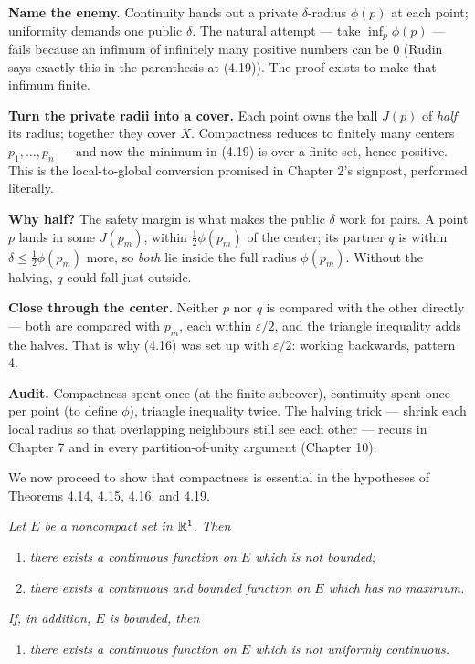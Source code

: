 \begin{proofwalk}
  \item \textbf{Name the enemy.} Continuity hands out a private
        $\delta$-radius $\phi(p)$ at each point; uniformity demands one
        public $\delta$. The natural attempt --- take
        $\inf_p \phi(p)$ --- fails because an infimum of infinitely many
        positive numbers can be $0$ (Rudin says exactly this in the
        parenthesis at (4.19)). The proof exists to make that infimum
        finite.
  \item \textbf{Turn the private radii into a cover.} Each point owns the
        ball $J(p)$ of \emph{half} its radius; together they cover $X$.
        Compactness reduces to finitely many centers $p_1,\dots,p_n$ --- and
        now the minimum in (4.19) is over a finite set, hence positive. This
        is the local-to-global conversion promised in Chapter 2's signpost,
        performed literally.
  \item \textbf{Why half?} The safety margin is what makes the public
        $\delta$ work for pairs. A point $p$ lands in some $J(p_m)$, within
        $\tfrac12\phi(p_m)$ of the center; its partner $q$ is within
        $\delta \le \tfrac12\phi(p_m)$ more, so \emph{both} lie inside the
        full radius $\phi(p_m)$. Without the halving, $q$ could fall just
        outside.
  \item \textbf{Close through the center.} Neither $p$ nor $q$ is compared
        with the other directly --- both are compared with $p_m$, each
        within $\varepsilon/2$, and the triangle inequality adds the halves.
        That is why (4.16) was set up with $\varepsilon/2$: working
        backwards, pattern 4.
  \item \textbf{Audit.} Compactness spent once (at the finite subcover),
        continuity spent once per point (to define $\phi$), triangle
        inequality twice. The halving trick --- shrink each local radius so
        that overlapping neighbours still see each other --- recurs in
        Chapter 7 and in every partition-of-unity argument (Chapter 10).
\end{proofwalk}

We now proceed to show that compactness is essential in the hypotheses of
Theorems 4.14, 4.15, 4.16, and 4.19.

\emph{Let $E$ be a noncompact set in $\mathbb{R}^1$. Then}
\begin{enumerate}[label=(\alph*), leftmargin=2.2em, itemsep=1pt, topsep=3pt]
  \item \emph{there exists a continuous function on $E$ which is not
        bounded;}
  \item \emph{there exists a continuous and bounded function on $E$ which
        has no maximum.}
\end{enumerate}
\emph{If, in addition, $E$ is bounded, then}
\begin{enumerate}[label=(\alph*), leftmargin=2.2em, itemsep=1pt, topsep=3pt,
                  start=3]
  \item \emph{there exists a continuous function on $E$ which is not
        uniformly continuous.}
\end{enumerate}

